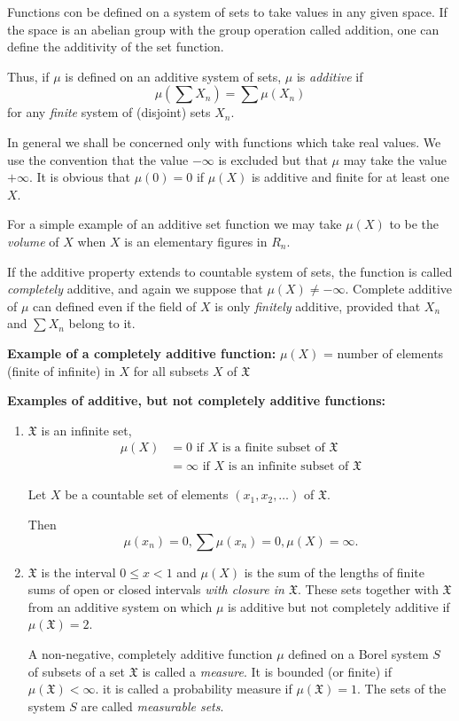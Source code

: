 Functions con be defined on a system of sets to take values in any
given space. If the space is an abelian group with the group operation
called addition, one can define the additivity of the set function. 

Thus, if $\mu$ is defined on an additive system of sets, $\mu$ is {\em
  additive} if
$$
\mu\left(\sum X_n\right)=\sum \mu(X_n)
$$ 
for any {\em finite} system of (disjoint) sets $X_n$.

In general we shall be concerned only with functions which take real
values. We use the convention that the value $-\infty$ is  excluded but
that $\mu $ may take the value $+ \infty$. It is obvious that
$\mu(0)=0$ if $\mu(X)$ is additive and finite for at least one $X$. 

For a simple example of an additive set function we may take $\mu(X)$
to be the {\em volume} of $X$ when $X$ is an elementary figures in $R_n$. 

If the additive property extends to countable system of sets, the
function is called {\em completely} additive, and again we suppose that $\mu
(X)\neq - \infty$. Complete additive of $\mu$ can defined even if the\pageoriginale
field of $X$ is only {\em finitely} additive, provided that $X_n$ and $\sum
X_n$ belong to it. 

\medskip
\noindent
{\bf Example of a completely additive function:} $\mu(X)$ = number of
elements (finite of infinite) in $X$ for all subsets $X$ of $\mathfrak{X}$

\medskip
\noindent
{\bf Examples of additive, but not completely additive functions:}
\begin{enumerate}
\item $\mathfrak{X}$ is an infinite set,
\begin{align*}
\mu(X)&= 0 \text{ if } X \text{ is a finite subset of } \mathfrak{X}\\
&=\infty \text{ if } X \text{ is an infinite subset of } \mathfrak{X}
\end{align*}

Let $X$ be a countable set of elements $(x_1,x_2,\ldots)$ of $\mathfrak{X}$.

Then
$$
\mu(x_n)=0, \sum \mu(x_n)=0, \mu(X)=\infty.
$$

\item $\mathfrak{X}$ is the interval $0\le x < 1$ and $\mu(X)$ is the
  sum of the lengths of finite sums of open or closed intervals {\em with
  closure in $\mathfrak{X}$}. 
  These sets together with $\mathfrak{X}$ from an additive system on
  which $\mu$ is additive but not completely additive if
  $\mu(\mathfrak{X})=2$. 

  A non-negative, completely additive function $\mu$ defined on a Borel
  system $S$ of subsets of a set $\mathfrak{X}$ is called a {\em measure}. It is
  bounded (or finite) if $\mu(\mathfrak{X}) < \infty$. it is called a
  probability measure if $\mu(\mathfrak{X})=1$. The sets of the system
  $S$ are called {\em measurable sets}. 
\end{enumerate}

